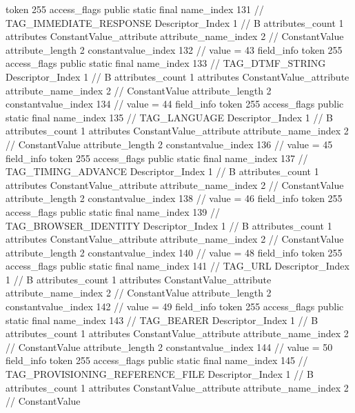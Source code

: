 {{{{{				token	255
				access_flags	public static final
				name_index	131		// TAG_IMMEDIATE_RESPONSE
				Descriptor_Index	1		// B
				attributes_count	1
				attributes {
				ConstantValue_attribute {
					attribute_name_index	2		// ConstantValue
					attribute_length	2
					constantvalue_index	132		// value = 43
				}
				}
			}
			field_info {
				token	255
				access_flags	public static final
				name_index	133		// TAG_DTMF_STRING
				Descriptor_Index	1		// B
				attributes_count	1
				attributes {
				ConstantValue_attribute {
					attribute_name_index	2		// ConstantValue
					attribute_length	2
					constantvalue_index	134		// value = 44
				}
				}
			}
			field_info {
				token	255
				access_flags	public static final
				name_index	135		// TAG_LANGUAGE
				Descriptor_Index	1		// B
				attributes_count	1
				attributes {
				ConstantValue_attribute {
					attribute_name_index	2		// ConstantValue
					attribute_length	2
					constantvalue_index	136		// value = 45
				}
				}
			}
			field_info {
				token	255
				access_flags	public static final
				name_index	137		// TAG_TIMING_ADVANCE
				Descriptor_Index	1		// B
				attributes_count	1
				attributes {
				ConstantValue_attribute {
					attribute_name_index	2		// ConstantValue
					attribute_length	2
					constantvalue_index	138		// value = 46
				}
				}
			}
			field_info {
				token	255
				access_flags	public static final
				name_index	139		// TAG_BROWSER_IDENTITY
				Descriptor_Index	1		// B
				attributes_count	1
				attributes {
				ConstantValue_attribute {
					attribute_name_index	2		// ConstantValue
					attribute_length	2
					constantvalue_index	140		// value = 48
				}
				}
			}
			field_info {
				token	255
				access_flags	public static final
				name_index	141		// TAG_URL
				Descriptor_Index	1		// B
				attributes_count	1
				attributes {
				ConstantValue_attribute {
					attribute_name_index	2		// ConstantValue
					attribute_length	2
					constantvalue_index	142		// value = 49
				}
				}
			}
			field_info {
				token	255
				access_flags	public static final
				name_index	143		// TAG_BEARER
				Descriptor_Index	1		// B
				attributes_count	1
				attributes {
				ConstantValue_attribute {
					attribute_name_index	2		// ConstantValue
					attribute_length	2
					constantvalue_index	144		// value = 50
				}
				}
			}
			field_info {
				token	255
				access_flags	public static final
				name_index	145		// TAG_PROVISIONING_REFERENCE_FILE
				Descriptor_Index	1		// B
				attributes_count	1
				attributes {
				ConstantValue_attribute {
					attribute_name_index	2		// ConstantValue
}}}}}}}
